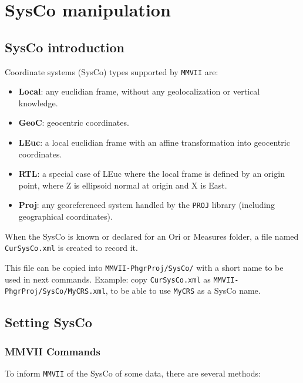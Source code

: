 \chapter{SysCo manipulation}
\label{Chap:SysCo}



\section{SysCo introduction}

Coordinate systems (SysCo) types supported by {\tt MMVII} are:
\begin{itemize}
\item \textbf{Local}: any euclidian frame, without any geolocalization or vertical knowledge.
\item \textbf{GeoC}: geocentric coordinates.
\item \textbf{LEuc}: a local euclidian frame with an affine transformation into geocentric coordinates.
\item \textbf{RTL}: a special case of LEuc where the local frame is defined by an origin point, where Z is ellipsoid normal at origin and X is East.
\item \textbf{Proj}: any georeferenced system handled by the {\tt PROJ} library (including geographical coordinates).
\end{itemize}

When the SysCo is known or declared for an Ori or Measures folder, a file named {\tt CurSysCo.xml}
is created to record it.

This file can be copied into {\tt MMVII-PhgrProj/SysCo/} with a short name to be used in next commands.
Example: copy {\tt CurSysCo.xml} as {\tt MMVII-PhgrProj/SysCo/MyCRS.xml}, to be able to use {\tt MyCRS}
as a SysCo name.

\section{Setting SysCo}

\subsection{MMVII Commands}
To inform {\tt MMVII} of the SysCo of some data, there are several methods:

